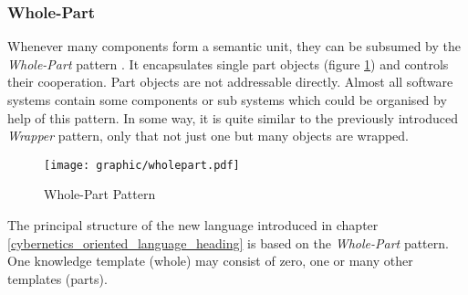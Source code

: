 %
%
%
%
%
%
%

\subsubsection{Whole-Part}
\label{whole_part_heading}

Whenever many components form a semantic unit, they can be subsumed by the
\emph{Whole-Part} pattern \cite{buschmann}. It encapsulates single part objects
(figure \ref{wholepart_figure}) and controls their cooperation. Part objects
are not addressable directly. Almost all software systems contain some
components or sub systems which could be organised by help of this pattern. In
some way, it is quite similar to the previously introduced \emph{Wrapper}
pattern, only that not just one but many objects are wrapped.

\begin{figure}[ht]
    \begin{center}
        \texttt{[image: graphic/wholepart.pdf]}
        \caption{Whole-Part Pattern}
        \label{wholepart_figure}
    \end{center}
\end{figure}

The principal structure of the new language introduced in chapter
\ref{cybernetics_oriented_language_heading} is based on the \emph{Whole-Part}
pattern. One knowledge template (whole) may consist of zero, one or many other
templates (parts).
